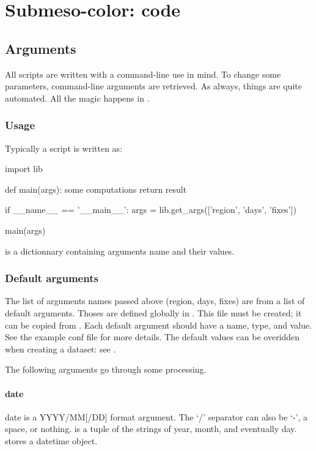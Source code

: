 \chapter{Submeso-color: code}

\section{Arguments}
\label{sec:org-args}

All scripts are written with a command-line use in mind.
To change some parameters, command-line arguments are retrieved. As always, things are quite automated.
All the magic happens in .

\subsection{Usage}
Typically a script is written as:
\begin{python}
import lib

def main(args):
    some computations
    return result

if __name__ == '__main__':
    args = lib.get_args(['region', 'days', 'fixes'])

    main(args)
\end{python}

 is a dictionnary containing arguments name and their values.

\subsection{Default arguments}
The list of arguments names passed above (region, days, fixes) are from a list of default arguments.
Thoses are defined globally in .
This file must be created; it can be copied from .
Each default argument should have a name, type, and value. See the example conf file for more details.
The default values can be overidden when creating a dataset: see .

The following arguments go through some processing.

\subsubsection{date}

date is a YYYY/MM[/DD] format argument. The `/' separator can also be `-', a space, or nothing.
 is a tuple of the strings of year, month, and eventually day\@.  stores a datetime object.

